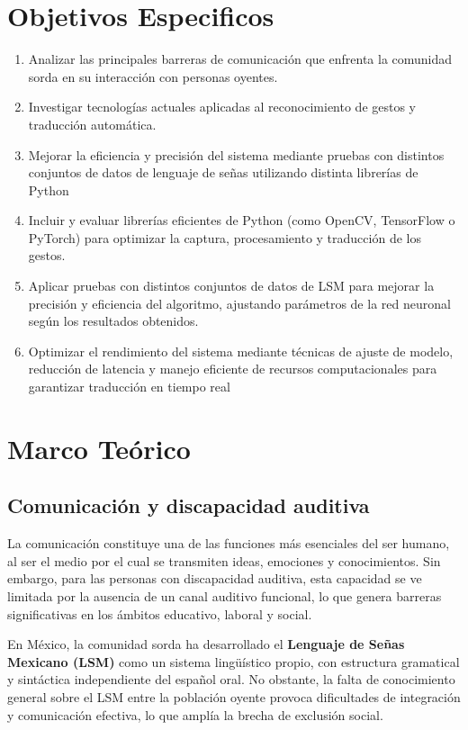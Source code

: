 \documentclass[12pt, oneside]{report}
\begin{document}
\chapter{Objetivos Especificos}
\begin{enumerate}
  \item Analizar las principales barreras de comunicación que enfrenta la comunidad sorda en su interacción con personas oyentes.
  \item Investigar tecnologías actuales aplicadas al reconocimiento de gestos y traducción automática.
  \item Mejorar  la eficiencia y precisión del sistema mediante pruebas con distintos conjuntos de datos de lenguaje de señas utilizando distinta librerías de Python
  \item Incluir y evaluar librerías eficientes de Python (como OpenCV, TensorFlow o PyTorch) para optimizar la captura, procesamiento y traducción de los gestos.
  \item Aplicar pruebas con distintos conjuntos de datos de LSM para mejorar la precisión y eficiencia del algoritmo, ajustando parámetros de la red neuronal según los resultados obtenidos.
  \item Optimizar el rendimiento del sistema mediante técnicas de ajuste de modelo, reducción de latencia y manejo eficiente de recursos computacionales para garantizar traducción en tiempo real

\end{enumerate}

\chapter{Marco Teórico}

\section{Comunicación y discapacidad auditiva}
La comunicación constituye una de las funciones más esenciales del ser humano, al ser el medio por el cual se transmiten ideas, emociones y conocimientos. Sin embargo, para las personas con discapacidad auditiva, esta capacidad se ve limitada por la ausencia de un canal auditivo funcional, lo que genera barreras significativas en los ámbitos educativo, laboral y social.

En México, la comunidad sorda ha desarrollado el \textbf{Lenguaje de Señas Mexicano (LSM)} como un sistema lingüístico propio, con estructura gramatical y sintáctica independiente del español oral. No obstante, la falta de conocimiento general sobre el LSM entre la población oyente provoca dificultades de integración y comunicación efectiva, lo que amplía la brecha de exclusión social.
\end{document}
